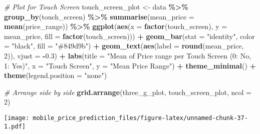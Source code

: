 \documentclass[
]{article}
\newenvironment{Shaded}{\begin{snugshade}}{\end{snugshade}}
\newcommand{\AttributeTok}[1]{\textcolor[rgb]{0.13,0.29,0.53}{#1}}
\newcommand{\CommentTok}[1]{\textcolor[rgb]{0.56,0.35,0.01}{\textit{#1}}}
\newcommand{\DecValTok}[1]{\textcolor[rgb]{0.00,0.00,0.81}{#1}}
\newcommand{\FloatTok}[1]{\textcolor[rgb]{0.00,0.00,0.81}{#1}}
\newcommand{\FunctionTok}[1]{\textcolor[rgb]{0.13,0.29,0.53}{\textbf{#1}}}
\newcommand{\NormalTok}[1]{#1}
\newcommand{\OtherTok}[1]{\textcolor[rgb]{0.56,0.35,0.01}{#1}}
\newcommand{\SpecialCharTok}[1]{\textcolor[rgb]{0.81,0.36,0.00}{\textbf{#1}}}
\newcommand{\StringTok}[1]{\textcolor[rgb]{0.31,0.60,0.02}{#1}}
\begin{document}
\begin{Shaded}
\begin{Highlighting}[]
\CommentTok{\# Plot for Touch Screen}
\NormalTok{touch\_screen\_plot }\OtherTok{\textless{}{-}}\NormalTok{ data }\SpecialCharTok{\%\textgreater{}\%}
  \FunctionTok{group\_by}\NormalTok{(touch\_screen) }\SpecialCharTok{\%\textgreater{}\%}
  \FunctionTok{summarise}\NormalTok{(}\AttributeTok{mean\_price =} \FunctionTok{mean}\NormalTok{(price\_range)) }\SpecialCharTok{\%\textgreater{}\%}
  \FunctionTok{ggplot}\NormalTok{(}\FunctionTok{aes}\NormalTok{(}\AttributeTok{x =} \FunctionTok{factor}\NormalTok{(touch\_screen), }\AttributeTok{y =}\NormalTok{ mean\_price, }\AttributeTok{fill =} \FunctionTok{factor}\NormalTok{(touch\_screen))) }\SpecialCharTok{+}
  \FunctionTok{geom\_bar}\NormalTok{(}\AttributeTok{stat =} \StringTok{"identity"}\NormalTok{, }\AttributeTok{color =} \StringTok{"black"}\NormalTok{, }\AttributeTok{fill =} \StringTok{"\#849d9b"}\NormalTok{) }\SpecialCharTok{+}
  \FunctionTok{geom\_text}\NormalTok{(}\FunctionTok{aes}\NormalTok{(}\AttributeTok{label =} \FunctionTok{round}\NormalTok{(mean\_price, }\DecValTok{2}\NormalTok{)), }\AttributeTok{vjust =} \SpecialCharTok{{-}}\FloatTok{0.3}\NormalTok{) }\SpecialCharTok{+}
  \FunctionTok{labs}\NormalTok{(}\AttributeTok{title =} \StringTok{"Mean of Price range per Touch Screen (0: No, 1: Yes)"}\NormalTok{, }\AttributeTok{x =} \StringTok{"Touch Screen"}\NormalTok{, }\AttributeTok{y =} \StringTok{"Mean Price Range"}\NormalTok{) }\SpecialCharTok{+}
  \FunctionTok{theme\_minimal}\NormalTok{() }\SpecialCharTok{+}
  \FunctionTok{theme}\NormalTok{(}\AttributeTok{legend.position =} \StringTok{"none"}\NormalTok{)}

\CommentTok{\# Arrange side by side}
\FunctionTok{grid.arrange}\NormalTok{(three\_g\_plot, touch\_screen\_plot, }\AttributeTok{ncol =} \DecValTok{2}\NormalTok{)}
\end{Highlighting}
\end{Shaded}

\texttt{[image: mobile\_price\_prediction\_files/figure-latex/unnamed-chunk-37-1.pdf]}
\end{document}
